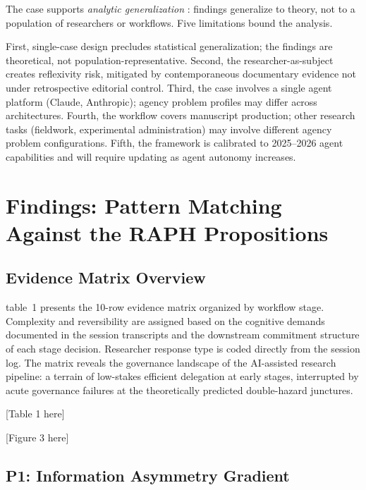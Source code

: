\documentclass[12pt]{article}
\begin{document}
The case supports \emph{analytic generalization} \citep{yin2014case}: findings generalize
to theory, not to a population of researchers or workflows. Five limitations bound the
analysis.

First, single-case design precludes statistical generalization; the findings are
theoretical, not population-representative. Second, the researcher-as-subject creates
reflexivity risk, mitigated by contemporaneous documentary evidence not under retrospective
editorial control. Third, the case involves a single agent platform (Claude, Anthropic);
agency problem profiles may differ across architectures. Fourth, the workflow covers
manuscript production; other research tasks (fieldwork, experimental administration) may
involve different agency problem configurations. Fifth, the framework is calibrated to
2025--2026 agent capabilities and will require updating as agent autonomy increases.

\section{Findings: Pattern Matching Against the RAPH Propositions}

\subsection{Evidence Matrix Overview}

table~1 presents the 10-row evidence matrix organized by workflow stage. Complexity and
reversibility are assigned based on the cognitive demands documented in the session
transcripts and the downstream commitment structure of each stage decision. Researcher
response type is coded directly from the session log. The matrix reveals the governance
landscape of the AI-assisted research pipeline: a terrain of low-stakes efficient delegation
at early stages, interrupted by acute governance failures at the theoretically predicted
double-hazard junctures.

\bigskip

[Table 1 here]

\bigskip

\bigskip

[Figure 3 here]

\bigskip

\subsection{P1: Information Asymmetry Gradient}
\end{document}
